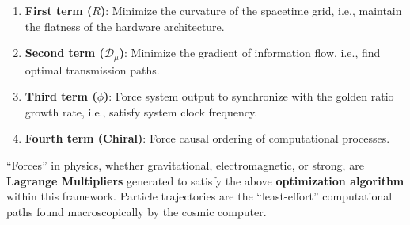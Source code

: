 \begin{enumerate}
\item \textbf{First term ($R$)}: Minimize the curvature of the spacetime grid, i.e., maintain the flatness of the hardware architecture.
\item \textbf{Second term ($\mathcal{D}_\mu$)}: Minimize the gradient of information flow, i.e., find optimal transmission paths.
\item \textbf{Third term ($\phi$)}: Force system output to synchronize with the golden ratio growth rate, i.e., satisfy system clock frequency.
\item \textbf{Fourth term (Chiral)}: Force causal ordering of computational processes.
\end{enumerate}

``Forces'' in physics, whether gravitational, electromagnetic, or strong, are \textbf{Lagrange Multipliers} generated to satisfy the above \textbf{optimization algorithm} within this framework. Particle trajectories are the ``least-effort'' computational paths found macroscopically by the cosmic computer.
